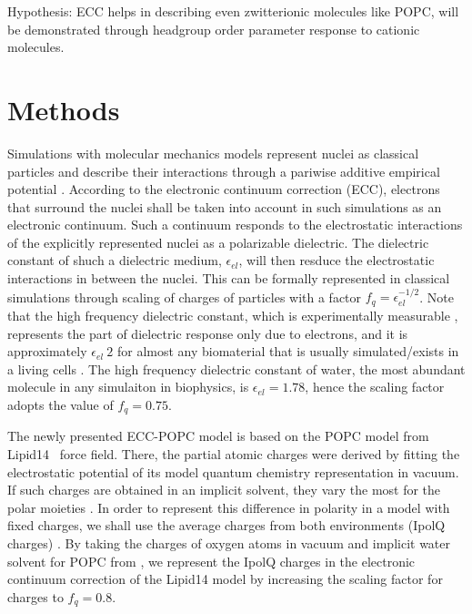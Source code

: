 \documentclass[aip,jcp,twocolumn]{revtex4}
\begin{document}
Hypothesis: ECC helps in describing even zwitterionic molecules like POPC, will be demonstrated through headgroup order parameter response to cationic molecules.

\section{Methods}

Simulations with molecular mechanics models represent nuclei as classical particles 
and describe their interactions through a pariwise additive empirical potential \cite{SOME_review, FF_papers}. 
According to the electronic continuum correction (ECC), electrons that surround 
the nuclei shall be taken into account in such simulations as an electronic continuum. \cite{leontyev11}
Such a continuum responds to the electrostatic interactions of the explicitly represented nuclei
as a polarizable dielectric. 
The dielectric constant of shuch a dielectric medium, $\epsilon _{el}$, will 
then resduce the electrostatic interactions in between the nuclei. 
This can be formally represented in classical simulations through scaling of charges of particles with a factor $f_q = \epsilon _{el} ^{-1/2}$. 
Note that the high frequency dielectric constant, which is experimentally measurable \cite{some_original_work, leontyev11}, represents
the part of dielectric response only due to electrons, and it is approximately $\epsilon _{el} ~ 2$ for almost any biomaterial that is
usually simulated/exists in a living cells .
The high frequency dielectric constant of water, 
the most abundant molecule in any simulaiton in biophysics, 
is $\epsilon _{el} = 1.78$, hence the scaling factor adopts the value of $f_q = 0.75$. \cite{some_orig_source, leontyev11}

The newly presented ECC-POPC model is based on the POPC model from Lipid14~\cite{dickson14} force field. 
There, the partial atomic charges were derived by 
fitting the electrostatic potential of its model quantum chemistry representation in vacuum. 
If such charges are obtained in an implicit solvent, they vary the most for the polar moieties \cite{maiejewski14}. 
In order to represent this difference in polarity in a model with fixed charges, 
we shall use the average charges from both environments (IpolQ charges) \cite{Cerutti2013}. 
By taking the charges of oxygen atoms in vacuum and implicit water solvent for POPC from \cite{maciejewski14}, 
we represent the IpolQ charges in the electronic continuum correction of the Lipid14 model
by increasing the scaling factor for charges to $f_q = 0.8$. 
\end{document}

